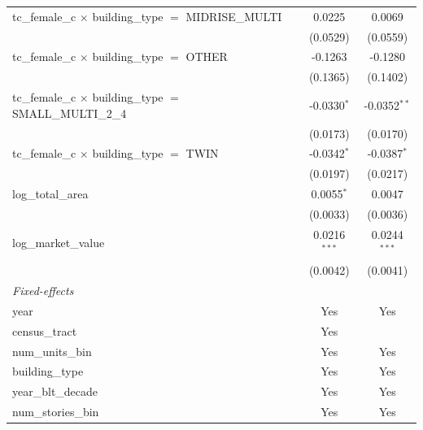 \begin{tabular}{lcc}
   tc\_female\_c $\times$ building\_type $=$ MIDRISE\_MULTI            & 0.0225         & 0.0069\\   
                                                                       & (0.0529)       & (0.0559)\\   
   tc\_female\_c $\times$ building\_type $=$ OTHER                     & -0.1263        & -0.1280\\   
                                                                       & (0.1365)       & (0.1402)\\   
   tc\_female\_c $\times$ building\_type $=$ SMALL\_MULTI\_2\_4        & -0.0330$^{*}$  & -0.0352$^{**}$\\   
                                                                       & (0.0173)       & (0.0170)\\   
   tc\_female\_c $\times$ building\_type $=$ TWIN                      & -0.0342$^{*}$  & -0.0387$^{*}$\\   
                                                                       & (0.0197)       & (0.0217)\\   
   log\_total\_area                                                    & 0.0055$^{*}$   & 0.0047\\   
                                                                       & (0.0033)       & (0.0036)\\   
   log\_market\_value                                                  & 0.0216$^{***}$ & 0.0244$^{***}$\\   
                                                                       & (0.0042)       & (0.0041)\\   
   \midrule
   \emph{Fixed-effects}\\
   year                                                                & Yes            & Yes\\  
   census\_tract                                                       & Yes            & \\  
   num\_units\_bin                                                     & Yes            & Yes\\  
   building\_type                                                      & Yes            & Yes\\  
   year\_blt\_decade                                                   & Yes            & Yes\\  
   num\_stories\_bin                                                   & Yes            & Yes\\  

\end{tabular}

